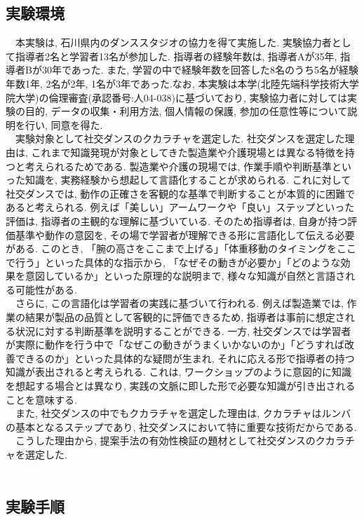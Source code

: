 \subsection{実験環境}
　本実験は, 石川県内のダンススタジオの協力を得て実施した. 実験協力者として指導者2名と学習者13名が参加した. 指導者の経験年数は, 指導者Aが35年, 指導者Bが30年であった. また, 学習の中で経験年数を回答した8名のうち5名が経験年数1年, 2名が2年, 1名が3年であった.なお, 本実験は本学(北陸先端科学技術大学院大学)の倫理審査(承認番号:人04-038)に基づいており, 実験協力者に対しては実験の目的, データの収集・利用方法, 個人情報の保護, 参加の任意性等について説明を行い, 同意を得た. \\
　実験対象として社交ダンスのクカラチャを選定した. 社交ダンスを選定した理由は, これまで知識発現が対象としてきた製造業や介護現場とは異なる特徴を持つと考えられるためである. 製造業や介護の現場では, 作業手順や判断基準といった知識を, 実務経験から想起して言語化することが求められる. これに対して社交ダンスでは, 動作の正確さを客観的な基準で判断することが本質的に困難であると考えられる. 例えば「美しい」アームワークや「良い」ステップといった評価は, 指導者の主観的な理解に基づいている. そのため指導者は, 自身が持つ評価基準や動作の意図を, その場で学習者が理解できる形に言語化して伝える必要がある. このとき, 「腕の高さをここまで上げる」「体重移動のタイミングをここで行う」といった具体的な指示から, 「なぜその動きが必要か」「どのような効果を意図しているか」といった原理的な説明まで, 様々な知識が自然と言語される可能性がある. \\
　さらに, この言語化は学習者の実践に基づいて行われる. 例えば製造業では, 作業の結果が製品の品質として客観的に評価できるため, 指導者は事前に想定される状況に対する判断基準を説明することができる. 一方, 社交ダンスでは学習者が実際に動作を行う中で「なぜこの動きがうまくいかないのか」「どうすれば改善できるのか」といった具体的な疑問が生まれ, それに応える形で指導者の持つ知識が表出されると考えられる. これは, ワークショップのように意図的に知識を想起する場合とは異なり, 実践の文脈に即した形で必要な知識が引き出されることを意味する. \\
　また, 社交ダンスの中でもクカラチャを選定した理由は, クカラチャはルンバの基本となるステップであり, 社交ダンスにおいて特に重要な技術だからである. \\
　こうした理由から, 提案手法の有効性検証の題材として社交ダンスのクカラチャを選定した.\\
\\


\subsection{実験手順}
